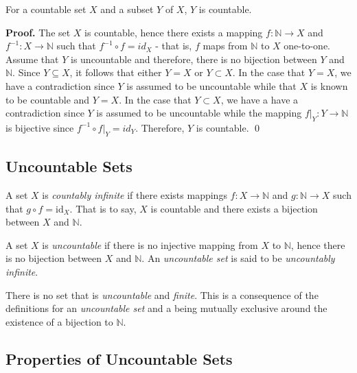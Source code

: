 \documentclass[10pt, letterpaper]{article}
\begin{document}
\begin{theorem}
For a countable set $X$ and a subset $Y$ of $X$, $Y$ is countable.

\textbf{Proof.} The set $X$ is countable, hence there exists a mapping $f: \mathbb{N} \to X$ and
$f^{-1} : X \to \mathbb{N}$ such that $f^{-1} \circ f = id_X$ - that is, $f$ maps from $\mathbb{N}$ to $X$ one-to-one.
Assume that $Y$ is uncountable and therefore, there is no bijection between $Y$ and $\mathbb{N}$. Since $Y \subseteq X$,
it follows that either $Y = X$ or $Y \subset X$. In the case that $Y = X$, we have a contradiction since $Y$ is assumed
to be uncountable while that $X$ is known to be countable and $Y = X$. In the case that $Y \subset X$, we have a have
a contradiction since $Y$ is assumed to be uncountable while the mapping $f|_Y : Y \to \mathbb{N}$ is bijective since
$f^{-1} \circ f|_Y = id_Y$. Therefore, $Y$ is countable. \qed

\end{theorem}

\subsection{Uncountable Sets}

\begin{definition}
A set $X$ is \textit{countably infinite} if there exists mappings $f : X \to \mathbb{N}$ and $g : \mathbb{N} \to X$ such
that $g \circ f = \text{id}_X$. That is to say, $X$ is countable and there exists a bijection between $X$ and
$\mathbb{N}$.
\end{definition}

\begin{definition}
A set $X$ is \textit{uncountable} if there is no injective mapping from $X$ to $\mathbb{N}$, hence there is no
bijection between $X$ and $\mathbb{N}$. An \textit{uncountable set} is said to be \textit{uncountably infinite}.
\end{definition}

\begin{remark}
There is no set that is \textit{uncountable} and \textit{finite}. This is a consequence of the definitions for an
\textit{uncountable set} and a  being mutually exclusive around the existence of a bijection
to $\mathbb{N}$.
\end{remark}

\subsection{Properties of Uncountable Sets}
\end{document}
